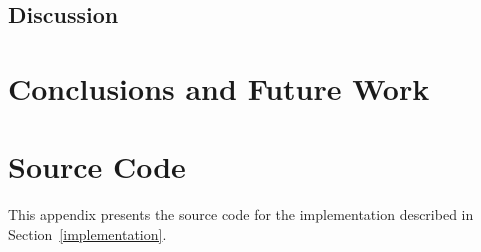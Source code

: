 \documentclass[a4paper,11pt]{article}
\newcommand{\Chapref}[1]{Section~\ref{#1}}
\numberwithin{equation}{section}
\begin{document}
\subsection{Discussion}
\label{evaluation:discussion}

\section{Conclusions and Future Work}
\label{conclusions}




\appendix
\section{Source Code}
\label{source code}

This appendix presents the source code for the implementation described in \Chapref{implementation}.
\end{document}
